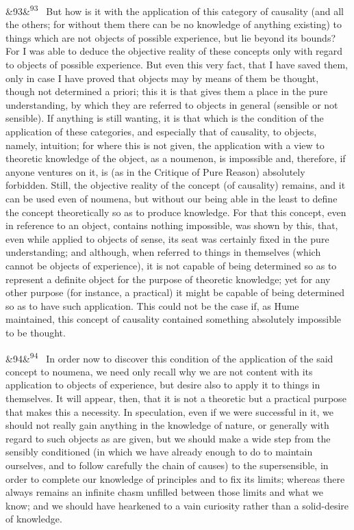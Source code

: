 \documentclass[12pt]{article}
\newcommand{\para}[1][]{\par\noindent\ifx&#1&\else\textsuperscript{\footnotesize #1}~\fi}
\begin{document}
\para[93] But how is it with the application of this category of causality (and all the others; for without them there can be no knowledge of anything existing) to things which are not objects of possible experience, but lie beyond its bounds? For I was able to deduce the objective reality of these concepts only with regard to objects of possible experience. But even this very fact, that I have saved them, only in case I have proved that objects may by means of them be thought, though not determined a priori; this it is that gives them a place in the pure understanding, by which they are referred to objects in general (sensible or not sensible). If anything is still wanting, it is that which is the condition of the application of these categories, and especially that of causality, to objects, namely, intuition; for where this is not given, the application with a view to theoretic knowledge of the object, as a noumenon, is impossible and, therefore, if anyone ventures on it, is (as in the Critique of Pure Reason) absolutely forbidden. Still, the objective reality of the concept (of causality) remains, and it can be used even of noumena, but without our being able in the least to define the concept theoretically so as to produce knowledge. For that this concept, even in reference to an object, contains nothing impossible, was shown by this, that, even while applied to objects of sense, its seat was certainly fixed in the pure understanding; and although, when referred to things in themselves (which cannot be objects of experience), it is not capable of being determined so as to represent a definite object for the purpose of theoretic knowledge; yet for any other purpose (for instance, a practical) it might be capable of being determined so as to have such application. This could not be the case if, as Hume maintained, this concept of causality contained something absolutely impossible to be thought.

\para[94] In order now to discover this condition of the application of the said concept to noumena, we need only recall why we are not content with its application to objects of experience, but desire also to apply it to things in themselves. It will appear, then, that it is not a theoretic but a practical purpose that makes this a necessity. In speculation, even if we were successful in it, we should not really gain anything in the knowledge of nature, or generally with regard to such objects as are given, but we should make a wide step from the sensibly conditioned (in which we have already enough to do to maintain ourselves, and to follow carefully the chain of causes) to the supersensible, in order to complete our knowledge of principles and to fix its limits; whereas there always remains an infinite chasm unfilled between those limits and what we know; and we should have hearkened to a vain curiosity rather than a solid-desire of knowledge.
\end{document}
